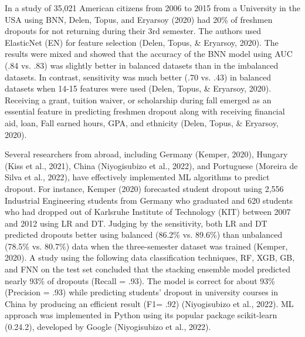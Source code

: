 \documentclass[notitlepage,12pt]{jedm}
\begin{document}
\par In a study of 35,021 American citizens from 2006 to 2015 from a University in the USA using BNN, Delen, Topus, and Eryarsoy (2020) had 20\% of freshmen dropouts for not returning during their 3rd semester.  The authors used ElasticNet (EN) for feature selection (Delen, Topus, \& Eryarsoy, 2020).  The results were mixed and showed that the accuracy of the BNN model using AUC (.84 vs. .83) was slightly better in balanced datasets than in the imbalanced datasets. In contrast, sensitivity was much better  (.70 vs. .43) in balanced datasets when 14-15 features were used (Delen, Topus, \& Eryarsoy, 2020).  Receiving a grant, tuition waiver, or scholarship during fall emerged as an essential feature in predicting freshmen dropout along with receiving financial aid, loan, Fall earned hours, GPA, and ethnicity (Delen, Topus, \& Eryarsoy, 2020).   

\par Several researchers from abroad, including Germany (Kemper, 2020), Hungary (Kiss et al., 2021), China (Niyogisubizo et al., 2022), and Portuguese (Moreira de Silva et al., 2022), have effectively implemented ML algorithms to predict dropout.  For instance, Kemper (2020) forecasted student dropout using 2,556 Industrial Engineering students from Germany who graduated and 620 students who had dropped out of Karlsruhe Institute of Technology (KIT) between 2007 and 2012 using LR and DT. Judging by the sensitivity, both LR and DT predicted dropouts better using balanced (86.2\% vs. 89.6\%) than unbalanced (78.5\% vs. 80.7\%) data when the three-semester dataset was trained (Kemper, 2020).  A study using the following data classification techniques, RF, XGB, GB, and FNN on the test set concluded that the stacking ensemble model predicted nearly 93\% of dropouts (Recall = .93). The model is correct for about 93\% (Precision = .93) while predicting students’ dropout in university courses in China by producing an efficient result (F1= .92) (Niyogisubizo et al., 2022).  ML approach was implemented in Python using its popular package scikit-learn (0.24.2), developed by Google (Niyogisubizo et al., 2022).  
\end{document}
